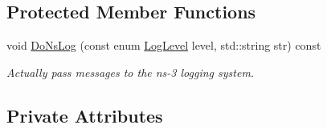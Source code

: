 \subsection*{Protected Member Functions}
\begin{DoxyCompactItemize}
\item 
void \hyperlink{classns3_1_1QueueBase_a192920fce3b354790e7c32441470417f}{Do\+Ns\+Log} (const enum \hyperlink{namespacens3_aa6464a4d69551a9cc968e17a65f39bdb}{Log\+Level} level, std\+::string str) const 
\begin{DoxyCompactList}\small\item\em Actually pass messages to the ns-\/3 logging system. \end{DoxyCompactList}\end{DoxyCompactItemize}
\subsection*{Private Attributes}
